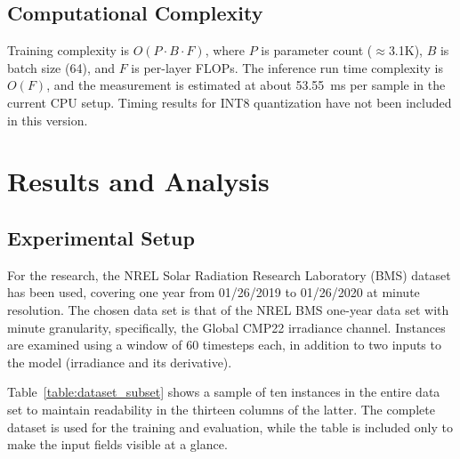 \documentclass[journal]{IEEEtran}
\begin{document}
\subsection{Computational Complexity}
Training complexity is $O(P \cdot B \cdot F)$, where $P$ is parameter count ($\approx$3.1K), $B$ is batch size (64), and $F$ is per-layer FLOPs. The inference run time complexity is $O(F)$, and the measurement is estimated at about 53.55~ms per sample in the current CPU setup. Timing results for INT8 quantization have not been included in this version.

\section{Results and Analysis}

\subsection{Experimental Setup}
For the research, the NREL Solar Radiation Research Laboratory (BMS) dataset has been used, covering one year from 01/26/2019 to 01/26/2020 at minute resolution. The chosen data set is that of the NREL BMS one-year data set with minute granularity, specifically, the Global CMP22 irradiance channel. Instances are examined using a window of 60 timesteps each, in addition to two inputs to the model (irradiance and its derivative).


Table~\ref{table:dataset_subset} shows a sample of ten instances in the entire data set to maintain readability in the thirteen columns of the latter. The complete dataset is used for the training and evaluation, while the table is included only to make the input fields visible at a glance.
\end{document}
